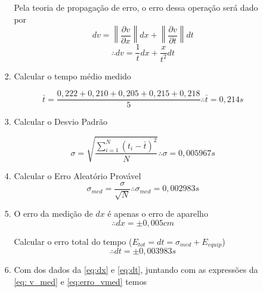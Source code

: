 \begin{enumerate}
\begin{enumerate}
\begin{enumerate}
            Pela teoria de propagação de erro, o erro dessa operação será dado por
            \begin{equation*}
                dv = \left\| \frac{\partial v}{\partial x}\right\| dx + \left\| \frac{\partial v}{\partial t}\right\| dt 
            \end{equation*}
            \begin{equation} \label{eq:erro_vmed}
                \therefore dv = \frac{1}{t} dx + \frac{x}{t^2} dt
            \end{equation}

            \item Calcular o tempo médio medido

            \begin{equation}
                \bar{t} = \frac{0,222 + 0,210 + 0,205 + 0,215 + 0,218}{5} \therefore \bar{t} = 0,214s
            \end{equation}

            \item Calcular o Desvio Padrão 

            \begin{equation}
                \sigma = \sqrt{\frac{\sum_{i=1}^N \left(t_i - \bar{t}\right)^2 }{N}} \therefore \sigma = 0,005967s
            \end{equation}

            \item Calcular o Erro Aleatório Provável
            \begin{equation}
                \sigma_{med} = \frac{\sigma}{\sqrt{N}} \therefore \sigma_{med} = 0,002983s
            \end{equation}

            \item O erro da medição de $dx$ é apenas o erro de aparelho 
            \begin{equation}
                \label{eq:dx}
                \therefore dx = \pm 0,005cm
            \end{equation}
            
            Calcular o erro total do tempo ($E_{tot} = dt = \sigma_{med} + E_{equip}$)
            \begin{equation}
                \label{eq:dt}
                \therefore dt = \pm 0,003983s
            \end{equation}

            \item Com dos dados da \autoref{eq:dx} e \autoref{eq:dt}, juntando com as expressões da \autoref{eq: v_med} e \autoref{eq:erro_vmed} temos


\end{enumerate}
\end{enumerate}
\end{enumerate}
